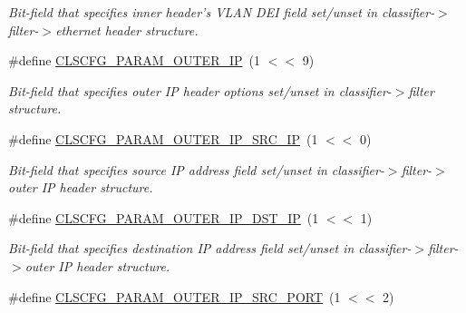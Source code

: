 \begin{DoxyCompactItemize}
\begin{DoxyCompactList}\small\item\em Bit-\/field that specifies inner header's V\-L\-A\-N D\-E\-I field set/unset in classifier-\/$>$filter-\/$>$ethernet header structure. \end{DoxyCompactList}\item 
\hypertarget{group__FAPI__QOS__CLASS_ga9de8f5051b3801ac096224790d765a07}{\#define \hyperlink{group__FAPI__QOS__CLASS_ga9de8f5051b3801ac096224790d765a07}{C\-L\-S\-C\-F\-G\-\_\-\-P\-A\-R\-A\-M\-\_\-\-O\-U\-T\-E\-R\-\_\-\-I\-P}~(1 $<$$<$ 9)}\label{group__FAPI__QOS__CLASS_ga9de8f5051b3801ac096224790d765a07}

\begin{DoxyCompactList}\small\item\em Bit-\/field that specifies outer I\-P header options set/unset in classifier-\/$>$filter structure. \end{DoxyCompactList}\item 
\hypertarget{group__FAPI__QOS__CLASS_ga5b5e7049c7b80d793cf368ae3a7e1cc3}{\#define \hyperlink{group__FAPI__QOS__CLASS_ga5b5e7049c7b80d793cf368ae3a7e1cc3}{C\-L\-S\-C\-F\-G\-\_\-\-P\-A\-R\-A\-M\-\_\-\-O\-U\-T\-E\-R\-\_\-\-I\-P\-\_\-\-S\-R\-C\-\_\-\-I\-P}~(1 $<$$<$ 0)}\label{group__FAPI__QOS__CLASS_ga5b5e7049c7b80d793cf368ae3a7e1cc3}

\begin{DoxyCompactList}\small\item\em Bit-\/field that specifies source I\-P address field set/unset in classifier-\/$>$filter-\/$>$outer I\-P header structure. \end{DoxyCompactList}\item 
\hypertarget{group__FAPI__QOS__CLASS_ga25cff77fe5bd05d915622e881c839fc3}{\#define \hyperlink{group__FAPI__QOS__CLASS_ga25cff77fe5bd05d915622e881c839fc3}{C\-L\-S\-C\-F\-G\-\_\-\-P\-A\-R\-A\-M\-\_\-\-O\-U\-T\-E\-R\-\_\-\-I\-P\-\_\-\-D\-S\-T\-\_\-\-I\-P}~(1 $<$$<$ 1)}\label{group__FAPI__QOS__CLASS_ga25cff77fe5bd05d915622e881c839fc3}

\begin{DoxyCompactList}\small\item\em Bit-\/field that specifies destination I\-P address field set/unset in classifier-\/$>$filter-\/$>$outer I\-P header structure. \end{DoxyCompactList}\item 
\hypertarget{group__FAPI__QOS__CLASS_gab1636333a476b82f43d834e25432382e}{\#define \hyperlink{group__FAPI__QOS__CLASS_gab1636333a476b82f43d834e25432382e}{C\-L\-S\-C\-F\-G\-\_\-\-P\-A\-R\-A\-M\-\_\-\-O\-U\-T\-E\-R\-\_\-\-I\-P\-\_\-\-S\-R\-C\-\_\-\-P\-O\-R\-T}~(1 $<$$<$ 2)}\label{group__FAPI__QOS__CLASS_gab1636333a476b82f43d834e25432382e}


\end{DoxyCompactItemize}

